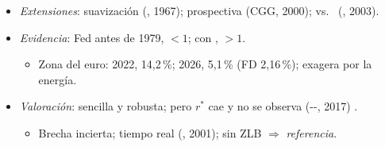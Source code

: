 \documentclass{article}
\begin{document}
\begin{columnas}
\begin{itemize}
  \begin{itemize}
  \item {}: $\phi_\pi>1$: el tipo \emph{real} sube con la inflación.
  \end{itemize}
\item \emph{Extensiones}: suavización (, 1967); prospectiva (CGG, 2000);  vs.\  (, 2003).
\item \emph{Evidencia}: Fed antes de 1979, $<1$; con , $>1$.
  \begin{itemize}
  \item Zona del euro: 2022, 14,2\,\%; 2026, 5,1\,\% (FD 2,16\,\%); exagera por la energía.
  \end{itemize}
\end{itemize}
\begin{itemize}
\item \emph{Valoración}: sencilla y robusta; pero $r^*$ cae y no se observa (--, 2017) .
  \begin{itemize}
  \item Brecha incierta; tiempo real (, 2001); sin ZLB $\Rightarrow$ \emph{referencia}.
  \end{itemize}
\end{itemize}


\end{columnas}
\end{document}
